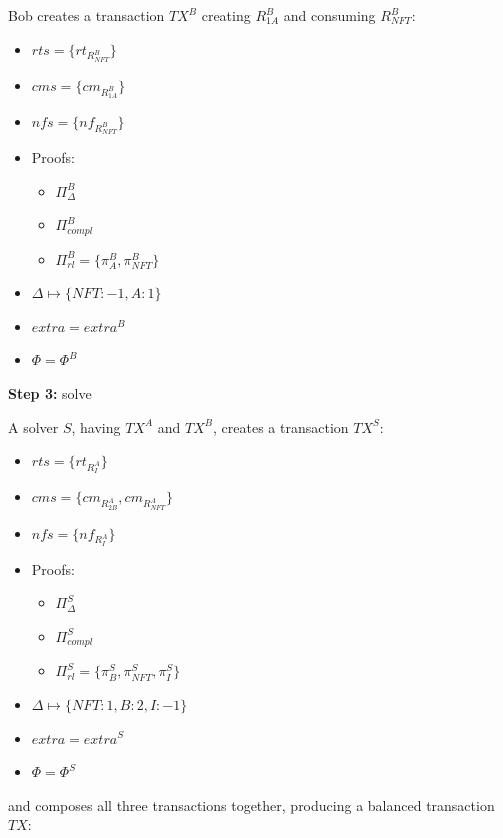 Bob creates a transaction $TX^B$ creating $R^B_{1A}$ and consuming $R^B_{NFT}$:
\begin{itemize}
    \item $rts= \{rt_{R^B_{NFT}}\}$
    \item $cms = \{cm_{R^B_{1A}}\}$
    \item $nfs = \{nf_{R^B_{NFT}}\}$
     \item Proofs:
    \begin{itemize}
        \item $\Pi^B_{\Delta}$
        \item $\Pi^B_{compl}$
        \item $\Pi^B_{rl} = \{\pi^B_A, \pi^B_{NFT}\}$
    \end{itemize}
    \item $\Delta \mapsto \{NFT: -1, A: 1\}$
    \item $extra = extra^B$
    \item $\Phi = \Phi^B$
\end{itemize}

\textbf{Step 3:} solve

A solver $S$, having $TX^A$ and $TX^B$, creates a transaction $TX^S$:

\begin{itemize}
    \item $rts= \{rt_{R^A_{I}}\}$
    \item $cms = \{cm_{R^A_{2B}}, cm_{R^A_{NFT}}\}$
    \item $nfs = \{nf_{R^A_{I}}\}$
         \item Proofs:
    \begin{itemize}
        \item $\Pi^S_{\Delta}$
        \item $\Pi^S_{compl}$
        \item $\Pi^S_{rl} = \{\pi^S_B, \pi^S_{NFT}, \pi^S_I\}$
    \end{itemize}
    \item $\Delta \mapsto \{NFT: 1, B: 2, I: -1\}$
    \item $extra = extra^S$
    \item $\Phi = \Phi^S$
\end{itemize}

and composes all three transactions together, producing a balanced transaction $TX$:

